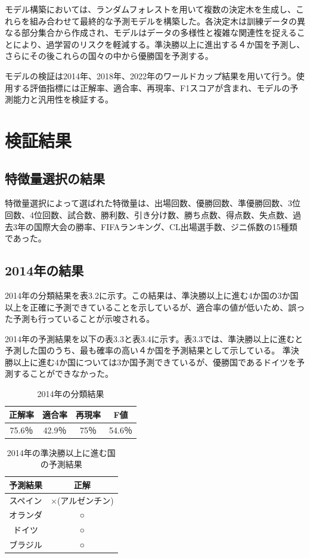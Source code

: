 \documentclass[platex]{suribt}
\begin{document}
モデル構築においては、ランダムフォレストを用いて複数の決定木を生成し、これらを組み合わせて最終的な予測モデルを構築した。各決定木は訓練データの異なる部分集合から作成され、モデルはデータの多様性と複雑な関連性を捉えることにより、過学習のリスクを軽減する。準決勝以上に進出する４か国を予測し、さらにその後これらの国々の中から優勝国を予測する。

モデルの検証は2014年、2018年、2022年のワールドカップ結果を用いて行う。使用する評価指標には正解率、適合率、再現率、F1スコアが含まれ、モデルの予測能力と汎用性を検証する。
\section{検証結果}
\subsection{特徴量選択の結果}
特徴量選択によって選ばれた特徴量は、出場回数、優勝回数、準優勝回数、3位回数、4位回数、試合数、勝利数、引き分け数、勝ち点数、得点数、失点数、過去3年の国際大会の勝率、FIFAランキング、CL出場選手数、ジニ係数の15種類であった。

\subsection{2014年の結果}

2014年の分類結果を表3.2に示す。この結果は、準決勝以上に進む4か国の3か国以上を正確に予測できていることを示しているが、適合率の値が低いため、誤った予測も行っていることが示唆される。

2014年の予測結果を以下の表3.3と表3.4に示す。表3.3では、準決勝以上に進むと予測した国のうち、最も確率の高い４か国を予測結果として示している。
準決勝以上に進む4か国については3か国予測できているが、優勝国であるドイツを予測することができなかった。

\begin{table}[h]
  \centering
  \begin{tabular}{|c|c|c|c|}
    \hline
    正解率 & 適合率 & 再現率 & F値 \\ \hline
    75.6％ & 42.9％ & 75％ & 54.6％ \\ \hline
  \end{tabular}
  \caption{2014年の分類結果}
\end{table}

\begin{table}[h]
  \centering
  \begin{tabular}{|c|c|}
    \hline
    予測結果 & 正解 \\ \hline
    スペイン &  ×(アルゼンチン)\\ \hline
    オランダ &  ○ \\ \hline
    ドイツ & ○ \\ \hline
    ブラジル & ○  \\ \hline
  \end{tabular}
  \caption{2014年の準決勝以上に進む国の予測結果}
\end{table}
\end{document}
